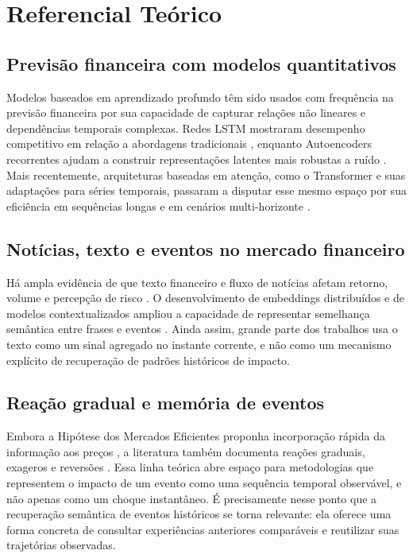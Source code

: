 \documentclass[conference]{IEEEtran}
\begin{document}
\section{Referencial Teórico}

\subsection{Previsão financeira com modelos quantitativos}

Modelos baseados em aprendizado profundo têm sido usados com frequência na previsão financeira por sua capacidade de capturar relações não lineares e dependências temporais complexas. Redes LSTM mostraram desempenho competitivo em relação a abordagens tradicionais \cite{Fischer:2018}, enquanto Autoencoders recorrentes ajudam a construir representações latentes mais robustas a ruído \cite{Bao:2017}. Mais recentemente, arquiteturas baseadas em atenção, como o Transformer e suas adaptações para séries temporais, passaram a disputar esse mesmo espaço por sua eficiência em sequências longas e em cenários multi-horizonte \cite{Vaswani:2017, Lim:2021, Wu:2021}.

\subsection{Notícias, texto e eventos no mercado financeiro}

Há ampla evidência de que texto financeiro e fluxo de notícias afetam retorno, volume e percepção de risco \cite{Tetlock:2007, Tetlock:2008, Loughran:2011, Mitra:2011}. O desenvolvimento de embeddings distribuídos e de modelos contextualizados ampliou a capacidade de representar semelhança semântica entre frases e eventos \cite{Mikolov:2013, Devlin:2019, Araci:2019, Reimers:2019}. Ainda assim, grande parte dos trabalhos usa o texto como um sinal agregado no instante corrente, e não como um mecanismo explícito de recuperação de padrões históricos de impacto.

\subsection{Reação gradual e memória de eventos}

Embora a Hipótese dos Mercados Eficientes proponha incorporação rápida da informação aos preços \cite{Fama:1970}, a literatura também documenta reações graduais, exageros e reversões \cite{Cutler:1989, Barberis:1998, Hong:1999}. Essa linha teórica abre espaço para metodologias que representem o impacto de um evento como uma sequência temporal observável, e não apenas como um choque instantâneo. É precisamente nesse ponto que a recuperação semântica de eventos históricos se torna relevante: ela oferece uma forma concreta de consultar experiências anteriores comparáveis e reutilizar suas trajetórias observadas.
\end{document}
